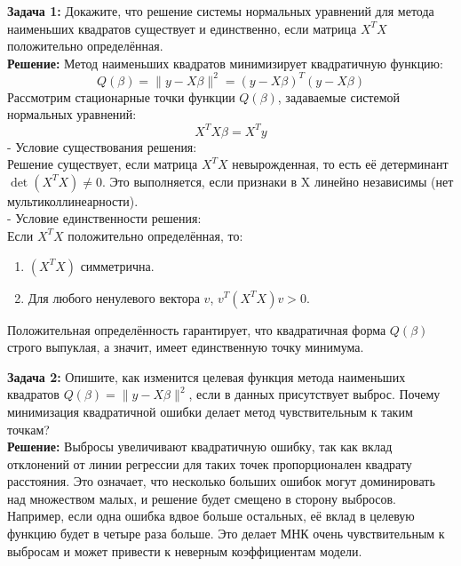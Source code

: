 \textbf{Задача 1:}
Докажите, что решение системы нормальных уравнений для метода наименьших квадратов существует и единственно, если матрица \(X^T X\) положительно определённая. \\
\textbf{Решение:}
Метод наименьших квадратов минимизирует квадратичную функцию:
\[
Q(\beta) = \|y - X\beta\|^2 = (y - X\beta)^T (y - X\beta)
\]
Рассмотрим стационарные точки функции \(Q(\beta)\), задаваемые системой нормальных уравнений:
\[
X^TX\beta = X^Ty
\]
- Условие существования решения: \\
Решение существует, если матрица \(X^T X\) невырожденная, то есть её детерминант \(\det(X^T X) \neq 0\). Это выполняется, если признаки в X линейно независимы (нет мультиколлинеарности). \\
- Условие единственности решения: \\
Если \(X^T X\) положительно определённая, то:
\begin{enumerate}
	\item \((X^T X)\) симметрична.
	\item Для любого ненулевого вектора \(v\), \(v^T(X^T X)v > 0\).
\end{enumerate}
Положительная определённость гарантирует, что квадратичная форма \(Q(\beta)\) строго выпуклая, а значит, имеет единственную точку минимума.

\textbf{Задача 2:}
Опишите, как изменится целевая функция метода наименьших квадратов \( Q(\beta) = \|y - X\beta\|^2 \), если в данных присутствует выброс. Почему минимизация квадратичной ошибки делает метод чувствительным к таким точкам? \\
\textbf{Решение:}
Выбросы увеличивают квадратичную ошибку, так как вклад отклонений от линии регрессии для таких точек пропорционален квадрату расстояния. Это означает, что несколько больших ошибок могут доминировать над множеством малых, и решение будет смещено в сторону выбросов. Например, если одна ошибка вдвое больше остальных, её вклад в целевую функцию будет в четыре раза больше. Это делает МНК очень чувствительным к выбросам и может привести к неверным коэффициентам модели.

